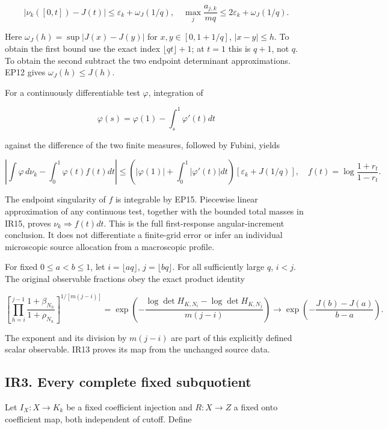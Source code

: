 \documentclass[10pt]{article}
\begin{document}
\[
 \left|\nu_k([0,t])-J(t)\right|
 \le\varepsilon_k+\omega_J(1/q),\quad
 \max_j\frac{a_{j,k}}{mq}\le2\varepsilon_k+\omega_J(1/q).
 \tag{IR15}
\]

Here \(\omega_J(h)=\sup|J(x)-J(y)|\) for \(x,y\in[0,1+1/q]\), \(|x-y|\le h\). To obtain the first bound use the exact index \(\lfloor qt\rfloor+1\); at \(t=1\) this is \(q+1\), not \(q\). To obtain the second subtract the two endpoint determinant approximations. EP12 gives \(\omega_J(h)\le J(h)\).

For a continuously differentiable test \(\varphi\), integration of

\[
 \varphi(s)=\varphi(1)-\int_s^1\varphi'(t)dt
\]

against the difference of the two finite measures, followed by Fubini, yields

\[
 \left|\int\varphi\,d\nu_k-\int_0^1\varphi(t)f(t)dt\right|
 \le\left(|\varphi(1)|+\int_0^1|\varphi'(t)|dt\right)
 [\varepsilon_k+J(1/q)],\quad
 f(t)=\log\frac{1+r_t}{1-r_t}.
 \tag{IR16}
\]

The endpoint singularity of \(f\) is integrable by EP15. Piecewise linear approximation of any continuous test, together with the bounded total masses in IR15, proves \(\nu_k\Rightarrow f(t)dt\). This is the full first-response angular-increment conclusion. It does not differentiate a finite-grid error or infer an individual microscopic source allocation from a macroscopic profile.

For fixed \(0\le a<b\le1\), let \(i=\lfloor aq\rfloor\), \(j=\lfloor bq\rfloor\). For all sufficiently large \(q\), \(i<j\). The original observable fractions obey the exact product identity

\[
 \left[\prod_{h=i}^{j-1}\frac{1+\beta_{N_h}}{1+\rho_{N_h}}\right]^{1/[m(j-i)]}
 =\exp\left(-\frac{\log\det H_{K,N_i}-\log\det H_{K,N_j}}{m(j-i)}\right)
 \longrightarrow\exp\left(-\frac{J(b)-J(a)}{b-a}\right).
 \tag{IR17}
\]

The exponent and its division by \(m(j-i)\) are part of this explicitly defined scalar observable. IR13 proves its map from the unchanged source data.

\subsection{IR3. Every complete fixed subquotient}\label{ir3.-every-complete-fixed-subquotient}

Let \(I_X:X\to K_k\) be a fixed coefficient injection and \(R:X\to Z\) a fixed onto coefficient map, both independent of cutoff. Define
\end{document}
